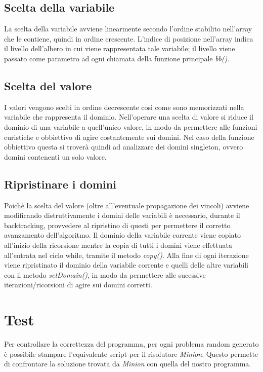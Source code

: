 \documentclass[a4paper,12pt,italian]{article}
\begin{document}
\subsection{Scelta della variabile}

La scelta della variabile avviene linearmente secondo l'ordine
stabilito nell'array che le contiene, quindi in ordine crescente. 
L'indice di posizione nell'array indica il livello dell'albero in cui viene
rappresentata tale
variabile; il livello viene passato come parametro ad ogni chiamata della
funzione principale \textit{bb()}.

\subsection{Scelta del valore}

I valori vengono scelti in ordine decrescente cos\`i come sono memorizzati
nella variabile che rappresenta il dominio. Nell'operare una scelta di valore
si riduce il dominio di una variabile a quell'unico valore, in modo da
permettere
alle funzioni euristiche e obbiettivo di agire costantemente sui domini.
Nel caso della funzione obbiettivo questa si trover\`a quindi ad analizzare
dei domini singleton, ovvero domini contenenti un solo valore.

\subsection{Ripristinare i domini}

Poich\`e la scelta del valore (oltre all'eventuale propagazione dei
vincoli) avviene modificando distruttivamente i domini delle variabili
\`e necessario, durante il backtracking, provvedere al ripristino di
questi per permettere il corretto avanzamento dell'algoritmo.  Il
dominio della variabile corrente viene copiato all'inizio della
ricorsione mentre la copia di tutti i domini viene effettuata
all'entrata nel ciclo while, tramite il metodo \textit{copy()}.  Alla
fine di ogni iterazione viene ripristinato il dominio della variabile
corrente e quelli delle altre variabili con il metodo
\textit{setDomain()}, in modo da permettere alle sucessive
iterazioni/ricorsioni di agire sui domini corretti.

\section{Test}

Per controllare la correttezza del programma, per ogni problema random
generato \`e possibile stampare l'equivalente script per il risolutore
\textit{Minion}. Questo permette di confrontare la soluzione trovata
da \textit{Minion} con quella del nostro programma.
\end{document}
